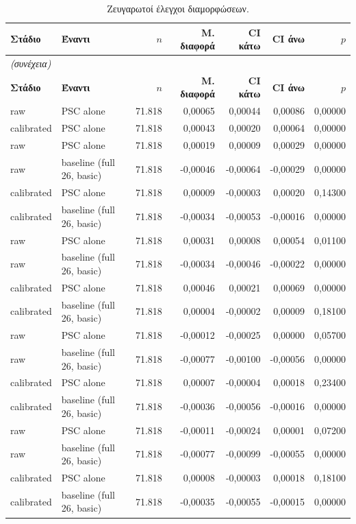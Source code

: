 {\footnotesize
\begin{longtable}{@{}llrrrrr@{}}
\caption{Ζευγαρωτοί έλεγχοι διαμορφώσεων.}\label{app:cfgsig}\\
\toprule \textbf{Στάδιο} & \textbf{Έναντι} & \textbf{$n$} & \textbf{Μ. διαφορά} & \textbf{CI κάτω} & \textbf{CI άνω} & \textbf{$p$} \\\midrule\endfirsthead
\multicolumn{7}{l}{\emph{(συνέχεια)}}\\\toprule \textbf{Στάδιο} & \textbf{Έναντι} & \textbf{$n$} & \textbf{Μ. διαφορά} & \textbf{CI κάτω} & \textbf{CI άνω} & \textbf{$p$} \\\midrule\endhead
\bottomrule\endfoot
raw & PSC alone & 71.818 & 0,00065 & 0,00044 & 0,00086 & 0,00000 \\
calibrated & PSC alone & 71.818 & 0,00043 & 0,00020 & 0,00064 & 0,00000 \\
raw & PSC alone & 71.818 & 0,00019 & 0,00009 & 0,00029 & 0,00000 \\
raw & baseline (full 26, basic) & 71.818 & -0,00046 & -0,00064 & -0,00029 & 0,00000 \\
calibrated & PSC alone & 71.818 & 0,00009 & -0,00003 & 0,00020 & 0,14300 \\
calibrated & baseline (full 26, basic) & 71.818 & -0,00034 & -0,00053 & -0,00016 & 0,00000 \\
raw & PSC alone & 71.818 & 0,00031 & 0,00008 & 0,00054 & 0,01100 \\
raw & baseline (full 26, basic) & 71.818 & -0,00034 & -0,00046 & -0,00022 & 0,00000 \\
calibrated & PSC alone & 71.818 & 0,00046 & 0,00021 & 0,00069 & 0,00000 \\
calibrated & baseline (full 26, basic) & 71.818 & 0,00004 & -0,00002 & 0,00009 & 0,18100 \\
raw & PSC alone & 71.818 & -0,00012 & -0,00025 & 0,00000 & 0,05700 \\
raw & baseline (full 26, basic) & 71.818 & -0,00077 & -0,00100 & -0,00056 & 0,00000 \\
calibrated & PSC alone & 71.818 & 0,00007 & -0,00004 & 0,00018 & 0,23400 \\
calibrated & baseline (full 26, basic) & 71.818 & -0,00036 & -0,00056 & -0,00016 & 0,00000 \\
raw & PSC alone & 71.818 & -0,00011 & -0,00024 & 0,00001 & 0,07200 \\
raw & baseline (full 26, basic) & 71.818 & -0,00077 & -0,00099 & -0,00055 & 0,00000 \\
calibrated & PSC alone & 71.818 & 0,00008 & -0,00003 & 0,00018 & 0,18100 \\
calibrated & baseline (full 26, basic) & 71.818 & -0,00035 & -0,00055 & -0,00015 & 0,00000 \\
\end{longtable}
}

